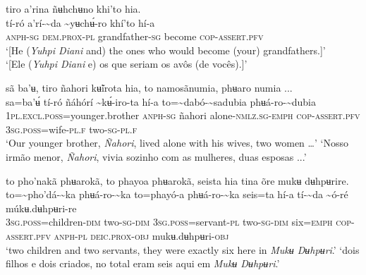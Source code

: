\documentclass[output=paper,
modfonts,nonflat
]{langsci/langscibook}
\begin{document}
\ea tiro a’rina ñʉhchʉno khi'to hia.\\[.3em]
\gll tí-ró	a’rí-{\textasciitilde}da	{\textasciitilde}yʉchʉ́-ro	khí'to	hí-a\\
     \textsc{anph-sg}	\textsc{dem.prox-pl}	grandfather\textsc{-sg}	become	\textsc{cop-assert.pfv}\\
\glt ‘[He (\textit{Yuhpi Diani} and) the ones who would become (your) grandfathers.]’\\
\glt ‘[Ele (\textit{Yuhpi Diani} e) os que seriam os avôs (de vocês).]'
\z 

\ea sã ba'ʉ, tiro ñahori kʉ̃irota hia, to namosãnumia, phʉaro numia ...\\[.3em]
\gll {\textasciitilde}sa=ba'ʉ́	tí-ró	ñáhórí	{\textasciitilde}kʉ́-iro-ta	hí-a to={\textasciitilde}dabó-{\textasciitilde}sadubia	phʉá-ro-{\textasciitilde}dubia\\
     1\textsc{pl.excl.poss}=younger.brother	\textsc{anph-sg}	ñahori	alone-\textsc{nmlz.sg-emph}	\textsc{cop-assert.pfv} 3\textsc{sg.poss}=wife-\textsc{pl.f}	two\textsc{-sg-pl.f}\\
\glt ‘Our younger brother, \textit{Ñahori}, lived alone with his wives, two women …’
\glt ‘Nosso irmão menor, \textit{Ñahori}, vivia sozinho com as mulheres, duas esposas ...’ 
\z 

\ea to pho'nakã phʉarokã, to phayoa phʉarokã, seista hia tina õre mukʉ dʉhpʉrire.\\[.3em]
\gll to={\textasciitilde}pho'dá-{\textasciitilde}ka	phʉá-ro-{\textasciitilde}ka	to=phayó-a	phʉá-ro-{\textasciitilde}ka seis{\footnotemark}=ta  		hí-a	tí-{\textasciitilde}da	{\textasciitilde}ó-ré	múkʉ.dʉhpʉri-re\\
     3\textsc{sg.poss}=children-\textsc{dim}	two\textsc{-sg-dim}	3\textsc{sg.poss}=servant-\textsc{pl}	two\textsc{-sg-dim} six=\textsc{emph}  		\textsc{cop-assert.pfv}	\textsc{anph-pl}	\textsc{deic.prox-obj}	mukʉ.dʉhpʉri\textsc{-obj}\\
\glt ‘two children and two servants, they were exactly six here in \textit{Mukʉ Dʉhpʉri}.’
\glt ‘dois filhos e dois criados, no total eram seis aqui em \textit{Mukʉ Dʉhpʉri}.’
\z 
\end{document}
